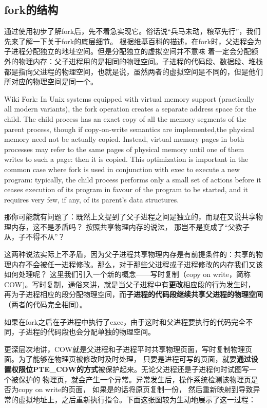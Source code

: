 \subsection{fork的结构}

通过使用初步了解fork后，先不着急实现它。俗话说“兵马未动，粮草先行”，我们先来了解一下关于fork的底层细节。
根据维基百科的描述，在fork时，父进程会为子进程分配独立的地址空间。但是分配独立的虚拟空间并不意味
着一定会分配额外的物理内存：父子进程用的是相同的物理空间。子进程的代码段、数据段、堆栈
都是指向父进程的物理空间，也就是说，虽然两者的虚拟空间是不同的，但是他们所对应的物理空间是同一个。

\begin{note}
\small{
Wiki Fork: In Unix systems equipped with virtual memory support (practically all modern variants), the fork operation creates a separate address space
 for the child. The child process has an exact copy of all the memory segments of the parent process, though if copy-on-write semantics 
 are implemented,the physical memory need not be actually copied. Instead, virtual memory pages in both processes may refer to the same pages of physical memory 
 until one of them writes to such a page: then it is copied. This optimization is important in the common case where fork is used 
 in conjunction with exec to execute a new program: typically, the child process performs only a small set of actions before it ceases
 execution of its program in favour of the program to be started, and it requires very few, if any, of its parent's data structures.}
\end{note}

那你可能就有问题了：既然上文提到了父子进程之间是独立的，而现在又说共享物理内存，这不是矛盾吗？
按照共享物理内存的说法， 那岂不是变成了“父教子从，子不得不从”？

这两种说法实际上不矛盾，因为父子进程共享物理内存是有前提条件的：共享的物理内存不会被任一进程修改。那么，对于那些父进程或子进程修改的内存我们又该如何处理呢？
这里我们引入一个新的概念——写时复制（copy on write，简称COW)。写时复制，通俗来讲，就是当父子进程中有\textbf{更改}相应段的行为发生时，
再为子进程相应的段分配物理空间，而\textbf{子进程的代码段继续共享父进程的物理空间}（两者的代码完全相同）。

\begin{note}
如果在fork之后在子进程中执行了exec，由于这时和父进程要执行的代码完全不同，子进程的代码段也会分配单独的物理空间。
\end{note}

更深层次地讲，COW就是父进程和子进程平时共享物理页面，写时复制物理页面。为了能够在物理页被修改时及时处理，
只要是进程可写的页面，就要\textbf{通过设置权限位PTE\_COW的方式}被保护起来。\label{页保护与处理}无论父进程还是子进程何时试图写一个被保护的
物理页，就会产生一个异常。异常发生后，操作系统检测该物理页是否为copy on write的页面， 如果是的话将原页复制一份，
然后重新映射到导致异常的虚拟地址上，之后重新执行指令。下面这张图较为生动地展示了这一过程：

